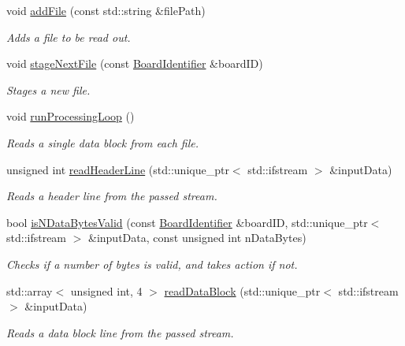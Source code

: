 \begin{DoxyCompactItemize}
\item 
void \hyperlink{class_file_reader_a3404694daef538fdd001a3e2ae898fb8}{add\+File} (const std\+::string \&file\+Path)
\begin{DoxyCompactList}\small\item\em Adds a file to be read out. \end{DoxyCompactList}\item 
void \hyperlink{class_file_reader_ad4d5d927c5d9ceb26bba7ec1f6c60737}{stage\+Next\+File} (const \hyperlink{class_board_identifier}{Board\+Identifier} \&board\+ID)
\begin{DoxyCompactList}\small\item\em Stages a new file. \end{DoxyCompactList}\item 
void \hyperlink{class_file_reader_a98606ec7d315f1ed6f90c531df0d09f9}{run\+Processing\+Loop} ()
\begin{DoxyCompactList}\small\item\em Reads a single data block from each file. \end{DoxyCompactList}\item 
unsigned int \hyperlink{class_file_reader_a94181d78b29ebacf2a4b3b3cd03a6750}{read\+Header\+Line} (std\+::unique\+\_\+ptr$<$ std\+::ifstream $>$ \&input\+Data)
\begin{DoxyCompactList}\small\item\em Reads a header line from the passed stream. \end{DoxyCompactList}\item 
bool \hyperlink{class_file_reader_ae0a796cb06ebe3e486795dea8da0f6bc}{is\+N\+Data\+Bytes\+Valid} (const \hyperlink{class_board_identifier}{Board\+Identifier} \&board\+ID, std\+::unique\+\_\+ptr$<$ std\+::ifstream $>$ \&input\+Data, const unsigned int n\+Data\+Bytes)
\begin{DoxyCompactList}\small\item\em Checks if a number of bytes is valid, and takes action if not. \end{DoxyCompactList}\item 
std\+::array$<$ unsigned int, 4 $>$ \hyperlink{class_file_reader_ac578b683eba751027766a2c30f03a28b}{read\+Data\+Block} (std\+::unique\+\_\+ptr$<$ std\+::ifstream $>$ \&input\+Data)
\begin{DoxyCompactList}\small\item\em Reads a data block line from the passed stream. \end{DoxyCompactList}\end{DoxyCompactItemize}
